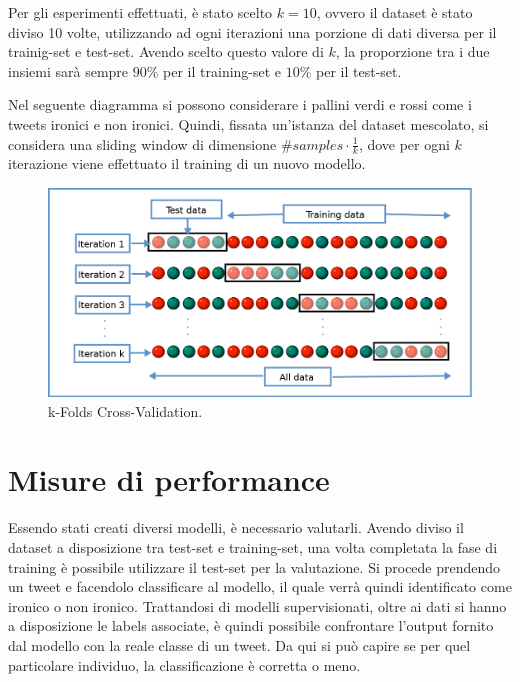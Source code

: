 \documentclass[oneside]{book}
\begin{document}
Per gli esperimenti effettuati, è stato scelto $k=10$, ovvero il dataset è stato diviso 10 volte, utilizzando ad ogni iterazioni una porzione di dati diversa per il trainig-set e test-set. Avendo scelto questo valore di $k$, la proporzione tra i due insiemi sarà sempre $90\%$ per il training-set e $10\%$ per il test-set.

Nel seguente diagramma si possono considerare i pallini verdi e rossi come i tweets ironici e non ironici. Quindi, fissata un'istanza del dataset mescolato, si considera una sliding window di dimensione $\#samples \cdot \frac{1}{k}$, dove per ogni $k$ iterazione viene effettuato il training di un nuovo modello.

\begin{figure}[!h]
	\centering
	\includegraphics[width=13cm]{assets/cross-validation.png}
	\caption[Caption for LOF]{k-Folds Cross-Validation.\footnotemark}
	\label{fig:cross-validation}
\end{figure}




\section{Misure di performance}
Essendo stati creati diversi modelli, è necessario valutarli. Avendo diviso il dataset a disposizione tra test-set e training-set, una volta completata la fase di training è possibile utilizzare il test-set per la valutazione. Si procede prendendo un tweet e facendolo classificare al modello, il quale verrà quindi identificato come ironico o non ironico. Trattandosi di modelli supervisionati, oltre ai dati si hanno a disposizione le labels associate, è quindi possibile confrontare l'output fornito dal modello con la reale classe di un tweet. Da qui si può capire se per quel particolare individuo, la classificazione è corretta o meno.
\end{document}
